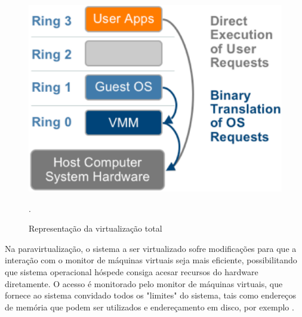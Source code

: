 \begin{figure}[!htb]
\centering
\includegraphics [keepaspectratio=true,scale=0.40]{figuras/full_virtualization_2.eps}
\caption{Representação da virtualização total}
\cite{vmware}.
\label{full_virtualization}
\end{figure}

Na paravirtualização, o sistema a ser virtualizado sofre modificações para que a interação com o monitor de máquinas virtuais seja mais eficiente, possibilitando que sistema operacional hóspede consiga acesar recursos do hardware diretamente. O acesso é monitorado pelo monitor de máquinas virtuais, que fornece ao sistema convidado todos os "limites" do sistema, tais como endereços de memória que podem ser utilizados e endereçamento em disco, por exemplo \cite{marcos}.

